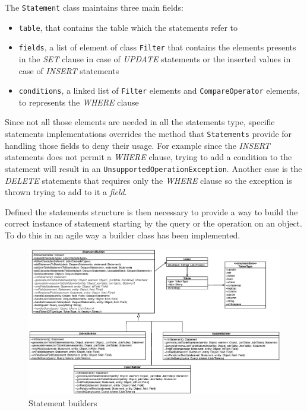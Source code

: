 \noindent The \texttt{Statement} class maintains three main fields:
\begin{itemize}
\item \texttt{table}, that contains the table which the statements refer to
\item \texttt{fields}, a list of element of class \texttt{Filter} that contains the elements presents in the \textit{SET} clause in case of \textit{UPDATE} statements or the inserted values in case of \textit{INSERT} statements
\item \texttt{conditions}, a linked list of \texttt{Filter} elements and \texttt{CompareOperator} elements, to represents the \textit{WHERE} clause 
\end{itemize} 

\noindent Since not all those elements are needed in all the statements type, specific statements implementations overrides the method that \texttt{Statements} provide for handling those fields to deny their usage. For example since the \textit{INSERT} statements does not permit a \textit{WHERE} clause, trying to add a condition to the statement will result in an \texttt{UnsupportedOperationException}. Another case is the \textit{DELETE} statements that requires only the \textit{WHERE} clause so the exception is thrown trying to add to it a \textit{field}.

\newparagraph Defined the statements structure is then necessary to provide a way to build the correct instance of statement starting by the query or the operation on an object.
To do this in an agile way a builder class has been implemented.

\begin{figure}[tbh]
  \includegraphics[width=16cm]{images/builders}
  \caption{Statement builders}
  \label{fig:builders}
\end{figure} 


